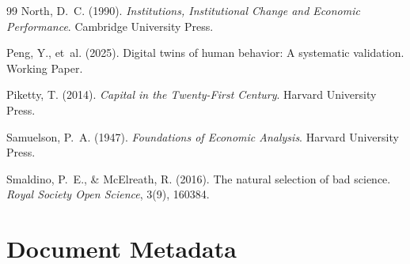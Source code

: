 \documentclass[12pt,a4paper]{article}
\theoremstyle{definition}
\begin{document}
\begin{thebibliography}{99}
North, D.~C. (1990).
\newblock \emph{Institutions, Institutional Change and Economic Performance}.
\newblock Cambridge University Press.

Peng, Y., et~al. (2025).
\newblock Digital twins of human behavior: A systematic validation.
\newblock Working Paper.

Piketty, T. (2014).
\newblock \emph{Capital in the Twenty-First Century}.
\newblock Harvard University Press.

Samuelson, P.~A. (1947).
\newblock \emph{Foundations of Economic Analysis}.
\newblock Harvard University Press.

Smaldino, P.~E., \& McElreath, R. (2016).
\newblock The natural selection of bad science.
\newblock \emph{Royal Society Open Science}, 3(9), 160384.

\end{thebibliography}


\newpage
\appendix
\section{Document Metadata}
\label{app:metadata}
\end{document}
